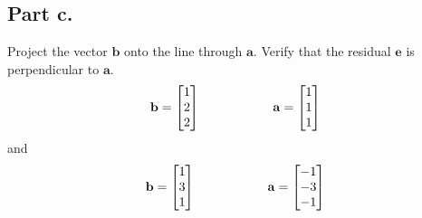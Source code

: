 \subsection{Part c.}
Project the vector $\mathbf{b}$ onto the line through $\mathbf{a}$. Verify
that the residual $\mathbf{e}$ is perpendicular to $\mathbf{a}$.
\begin{equation}
    \mathbf{b} = 
    \begin{bmatrix}
        1       \\
        2       \\
        2
    \end{bmatrix}
    \hspace{2.0cm} 
    \mathbf{a} =
    \begin{bmatrix}
        1       \\
        1       \\
        1
    \end{bmatrix}
\end{equation}
and 
\begin{equation}
    \mathbf{b} = 
    \begin{bmatrix}
        1       \\
        3       \\
        1
    \end{bmatrix}
    \hspace{2.0cm} 
    \mathbf{a} =
    \begin{bmatrix}
        -1       \\
        -3       \\
        -1
    \end{bmatrix}
\end{equation}

